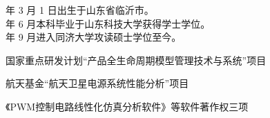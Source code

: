 年 3 月 1 日出生于山东省临沂市。\\
 年 6 月本科毕业于山东科技大学获得学士学位。\\
 年 9 月进入同济大学攻读硕士学位至今。


\begin{enumerate}[{[}1{]}]
\item 国家重点研发计划“产品全生命周期模型管理技术与系统”项目
\item 航天基金“航天卫星电源系统性能分析”项目
\item 《PWM控制电路线性化仿真分析软件》等软件著作权三项
\end{enumerate}
